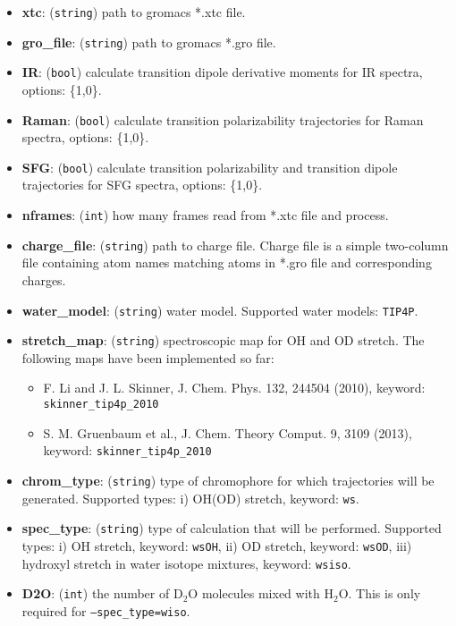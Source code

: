 \documentclass{article}
\begin{document}
\begin{itemize}

\item \textbf{xtc}: (\texttt{string}) path to gromacs *.xtc file.
\item \textbf{gro\_file}: (\texttt{string}) path to gromacs *.gro file.
\item \textbf{IR}: (\texttt{bool}) calculate transition dipole derivative moments for IR spectra, options: \{1,0\}.
\item \textbf{Raman}: (\texttt{bool}) calculate transition polarizability trajectories for Raman spectra, options: \{1,0\}.
\item \textbf{SFG}: (\texttt{bool}) calculate transition polarizability and transition dipole trajectories for SFG spectra, options: \{1,0\}.
\item \textbf{nframes}: (\texttt{int}) how many frames read from *.xtc file and process.
\item \textbf{charge\_file}: (\texttt{string}) path to charge file. Charge file is a simple two-column file containing atom names matching atoms in 
*.gro file and corresponding charges.
\item \textbf{water\_model}: (\texttt{string}) water model. Supported water models: \texttt{TIP4P}.
\item \textbf{stretch\_map}: (\texttt{string}) spectroscopic map for OH and OD stretch. The following maps have been implemented so far:
\begin{itemize}
\item F. Li and J. L. Skinner, J. Chem. Phys. 132, 244504 (2010), keyword: \texttt{skinner\_tip4p\_2010}
\item S. M. Gruenbaum et al., J. Chem. Theory Comput. 9, 3109 (2013), keyword: \texttt{skinner\_tip4p\_2010}
\end{itemize}
\item \textbf{chrom\_type}: (\texttt{string}) type of chromophore for which trajectories will be generated. Supported types:
i) OH(OD) stretch, keyword: \texttt{ws}.

\item \textbf{spec\_type}: (\texttt{string}) type of calculation that will be performed. Supported types: i) OH stretch, keyword: \texttt{wsOH},
ii) OD stretch, keyword: \texttt{wsOD}, iii) hydroxyl stretch in water isotope mixtures, keyword: \texttt{wsiso}.

\item \textbf{D2O}: (\texttt{int}) the number of D$_2$O molecules mixed with H$_2$O. This is only required for \texttt{--spec\_type=wiso}.


\end{itemize}
\end{document}
